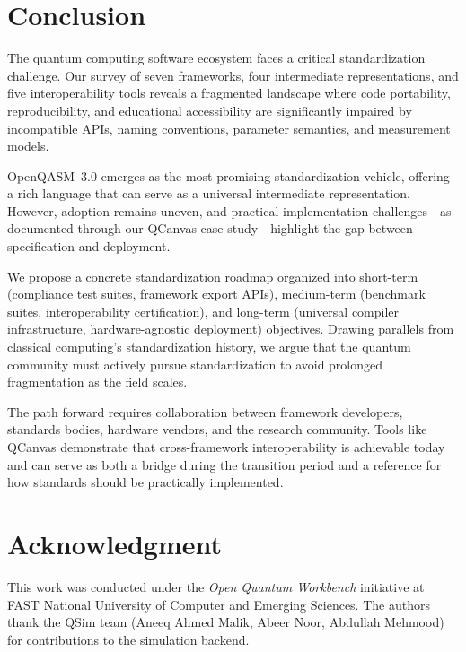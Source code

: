 \documentclass[journal]{IEEEtran}
\begin{document}
\section{Conclusion}
\label{sec:conclusion}

The quantum computing software ecosystem faces a critical standardization challenge. Our survey of seven frameworks, four intermediate representations, and five interoperability tools reveals a fragmented landscape where code portability, reproducibility, and educational accessibility are significantly impaired by incompatible APIs, naming conventions, parameter semantics, and measurement models.

OpenQASM~3.0 emerges as the most promising standardization vehicle, offering a rich language that can serve as a universal intermediate representation. However, adoption remains uneven, and practical implementation challenges---as documented through our QCanvas case study---highlight the gap between specification and deployment.

We propose a concrete standardization roadmap organized into short-term (compliance test suites, framework export APIs), medium-term (benchmark suites, interoperability certification), and long-term (universal compiler infrastructure, hardware-agnostic deployment) objectives. Drawing parallels from classical computing's standardization history, we argue that the quantum community must actively pursue standardization to avoid prolonged fragmentation as the field scales.

The path forward requires collaboration between framework developers, standards bodies, hardware vendors, and the research community. Tools like QCanvas demonstrate that cross-framework interoperability is achievable today and can serve as both a bridge during the transition period and a reference for how standards should be practically implemented.

\section*{Acknowledgment}

This work was conducted under the \emph{Open Quantum Workbench} initiative at FAST National University of Computer and Emerging Sciences. The authors thank the QSim team (Aneeq Ahmed Malik, Abeer Noor, Abdullah Mehmood) for contributions to the simulation backend.
\end{document}
